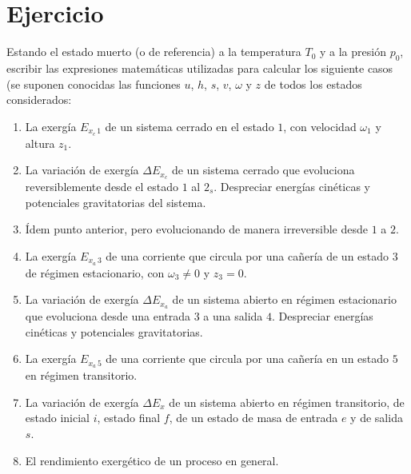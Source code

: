 \section{Ejercicio}\label{ej:Chap08Ejercicio01}
Estando el estado muerto (o de referencia) a la temperatura $T_0$ y a la presión $p_0$, escribir las expresiones matemáticas utilizadas para calcular los siguiente casos (se suponen conocidas las funciones $u$, $h$, $s$, $v$, $\omega$ y $z$ de todos los estados considerados:
\begin{enumerate}
    \item La exergía $E_{x_c\,1}$ de un sistema cerrado en el estado $1$, con velocidad $\omega_1$ y altura $z_1$.
    \item La variación de exergía $\Delta E_{x_c}$ de un sistema cerrado que evoluciona reversiblemente desde el estado $1$ al $2_s$. Despreciar energías cinéticas y potenciales gravitatorias del sistema.
    \item Ídem punto anterior, pero evolucionando de manera irreversible desde $1$ a $2$.
    \item La exergía $E_{x_a\,3}$ de una corriente que circula por una cañería de un estado $3$ de régimen estacionario, con $\omega_3\neq0$ y $z_3=0$.
    \item  La variación de exergía $\Delta E_{x_a}$ de un sistema abierto en régimen estacionario que evoluciona desde una entrada $3$ a una salida $4$. Despreciar energías cinéticas y potenciales gravitatorias.
    \item La exergía $E_{x_a\,5}$ de una corriente que circula por una cañería en un estado $5$ en régimen transitorio.
    \item La variación de exergía $\Delta E_x$ de un sistema abierto en régimen transitorio, de estado inicial $i$, estado final $f$, de un estado de masa de entrada $e$ y de salida $s$.
    \item El rendimiento exergético de un proceso en general.
\end{enumerate}